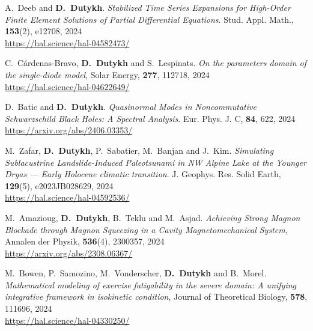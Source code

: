 \documentclass[final, a4paper, oneside, 12pt]{article}
\numberwithin{equation}{section}
\begin{document}
\begin{etaremune}
  \item A.~Deeb and \textbf{D.~Dutykh}. \textit{Stabilized Time Series Expansions for High-Order Finite Element Solutions of Partial Differential Equations}. Stud. Appl. Math., \textbf{153}(2), e12708, 2024 \\ %
  \url{https://hal.science/hal-04582473/}
  
  \item C.~C\'ardenas-Bravo, \textbf{D.~Dutykh} and S.~Lespinats. \textit{On the parameters domain of the single-diode model}, Solar Energy, \textbf{277}, 112718, 2024 \\ %
  \url{https://hal.science/hal-04622649/}
  
  \item D.~Batic and \textbf{D.~Dutykh}. \textit{Quasinormal Modes in Noncommutative Schwarzschild Black Holes: A Spectral Analysis}. Eur. Phys. J. C, \textbf{84}, 622, 2024 \\ %
  \url{https://arxiv.org/abs/2406.03353/}

  \item M.~Zafar, \textbf{D.~Dutykh}, P.~Sabatier, M.~Banjan and J.~Kim. \textit{Simulating Sublacustrine Landslide-Induced Paleotsunami in NW Alpine Lake at the Younger Dryas --- Early Holocene climatic transition}. J. Geophys. Res. Solid Earth, \textbf{129}(5), e2023JB028629, 2024 \\ %
  \url{https://hal.science/hal-04592536/}
  
  \item M.~Amazioug, \textbf{D.~Dutykh}, B.~Teklu and M.~Asjad. \textit{Achieving Strong Magnon Blockade through Magnon Squeezing in a Cavity Magnetomechanical System}, Annalen der Physik, \textbf{536}(4), 2300357, 2024 \\ %
  \url{https://arxiv.org/abs/2308.06367/}
  
  \item M.~Bowen, P.~Samozino, M.~Vonderscher, \textbf{D.~Dutykh} and B.~Morel. \textit{Mathematical modeling of exercise fatigability in the severe domain: A unifying integrative framework in isokinetic condition}, Journal of Theoretical Biology, \textbf{578}, 111696, 2024 \\ %
  \url{https://hal.science/hal-04330250/}
  
  


\end{etaremune}
\end{document}
